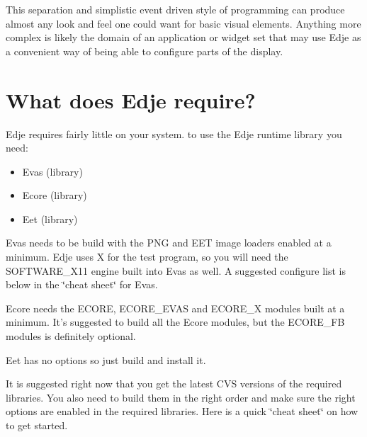 This separation and simplistic event driven style of programming can produce almost any look and feel one could want for basic visual elements. Anything more complex is likely the domain of an application or widget set that may use Edje as a convenient way of being able to configure parts of the display.\hypertarget{index_requirements}{}\section{What does Edje require?}\label{index_requirements}
Edje requires fairly little on your system. to use the Edje runtime library you need:

\begin{itemize}
\item Evas (library)\item Ecore (library)\item Eet (library)\end{itemize}


Evas needs to be build with the PNG and EET image loaders enabled at a minimum. Edje uses X for the test program, so you will need the SOFTWARE\_\-X11 engine built into Evas as well. A suggested configure list is below in the \char`\"{}cheat sheet\char`\"{} for Evas.

Ecore needs the ECORE, ECORE\_\-EVAS and ECORE\_\-X modules built at a minimum. It's suggested to build all the Ecore modules, but the ECORE\_\-FB modules is definitely optional.

Eet has no options so just build and install it.

It is suggested right now that you get the latest CVS versions of the required libraries. You also need to build them in the right order and make sure the right options are enabled in the required libraries. Here is a quick \char`\"{}cheat sheet\char`\"{} on how to get started.



